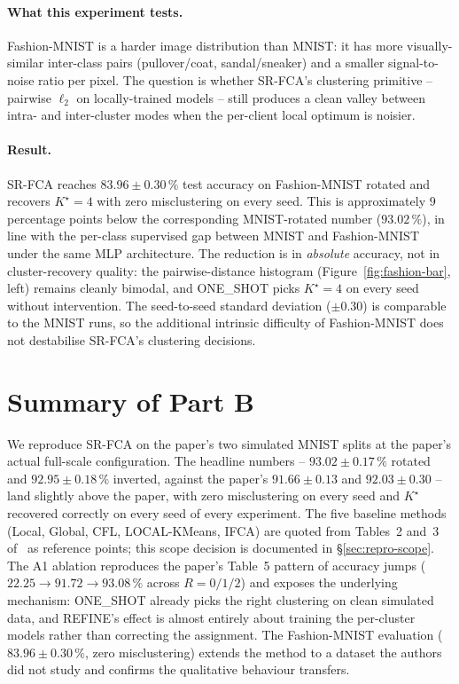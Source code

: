\paragraph{What this experiment tests.} Fashion-MNIST is a harder image distribution than MNIST: it has more visually-similar inter-class pairs (pullover/coat, sandal/sneaker) and a smaller signal-to-noise ratio per pixel. The question is whether SR-FCA's clustering primitive -- pairwise $\ell_2$ on locally-trained models -- still produces a clean valley between intra- and inter-cluster modes when the per-client local optimum is noisier.

\paragraph{Result.} SR-FCA reaches $83.96 \pm 0.30\,\%$ test accuracy on Fashion-MNIST rotated and recovers $K^\star = 4$ with zero misclustering on every seed. This is approximately $9$ percentage points below the corresponding MNIST-rotated number ($93.02\,\%$), in line with the per-class supervised gap between MNIST and Fashion-MNIST under the same MLP architecture. The reduction is in \emph{absolute} accuracy, not in cluster-recovery quality: the pairwise-distance histogram (Figure~\ref{fig:fashion-bar}, left) remains cleanly bimodal, and ONE\_SHOT picks $K^\star = 4$ on every seed without intervention. The seed-to-seed standard deviation ($\pm 0.30$) is comparable to the MNIST runs, so the additional intrinsic difficulty of Fashion-MNIST does not destabilise SR-FCA's clustering decisions.

\section{Summary of Part B}\label{sec:part-b-summary}

We reproduce SR-FCA on the paper's two simulated MNIST splits at the paper's actual full-scale configuration. The headline numbers -- $93.02 \pm 0.17\,\%$ rotated and $92.95 \pm 0.18\,\%$ inverted, against the paper's $91.66 \pm 0.13$ and $92.03 \pm 0.30$ -- land slightly above the paper, with zero misclustering on every seed and $K^\star$ recovered correctly on every seed of every experiment. The five baseline methods (Local, Global, CFL, LOCAL-KMeans, IFCA) are quoted from Tables~2 and~3 of~\parencite{vardhan2024srfca} as reference points; this scope decision is documented in \S\ref{sec:repro-scope}. The A1 ablation reproduces the paper's Table~5 pattern of accuracy jumps ($22.25 \to 91.72 \to 93.08\,\%$ across $R = 0/1/2$) and exposes the underlying mechanism: ONE\_SHOT already picks the right clustering on clean simulated data, and REFINE's effect is almost entirely about training the per-cluster models rather than correcting the assignment. The Fashion-MNIST evaluation ($83.96 \pm 0.30\,\%$, zero misclustering) extends the method to a dataset the authors did not study and confirms the qualitative behaviour transfers.
